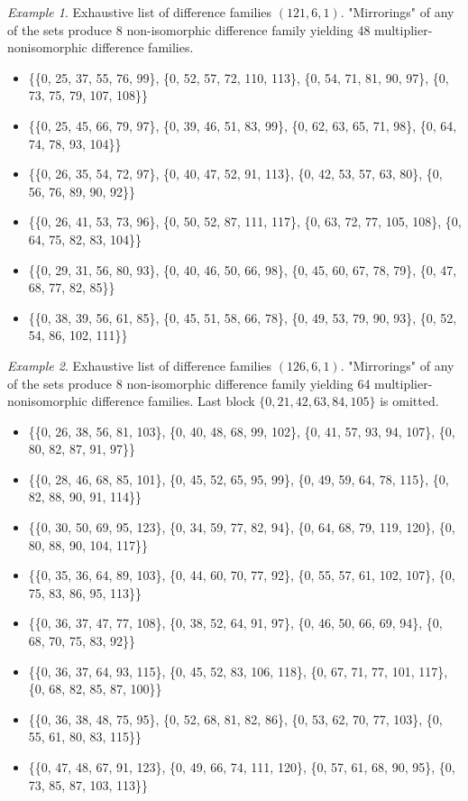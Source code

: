 \documentclass{amsart}
\theoremstyle{plain}
\theoremstyle{definition}
\theoremstyle{remark}
\newtheorem{example}{Example}[section]
\begin{document}
\begin{example} Exhaustive list of difference families $(121,6,1)$. "Mirrorings" of any of the sets produce 8 non-isomorphic difference family yielding 48 multiplier-nonisomorphic difference families.
\begin{itemize}
    \item \{\{0, 25, 37, 55, 76, 99\}, \{0, 52, 57, 72, 110, 113\}, \{0, 54, 71, 81, 90, 97\}, \{0, 73, 75, 79, 107, 108\}\}
    \item \{\{0, 25, 45, 66, 79, 97\}, \{0, 39, 46, 51, 83, 99\}, \{0, 62, 63, 65, 71, 98\}, \{0, 64, 74, 78, 93, 104\}\}
    \item \{\{0, 26, 35, 54, 72, 97\}, \{0, 40, 47, 52, 91, 113\}, \{0, 42, 53, 57, 63, 80\}, \{0, 56, 76, 89, 90, 92\}\}
    \item \{\{0, 26, 41, 53, 73, 96\}, \{0, 50, 52, 87, 111, 117\}, \{0, 63, 72, 77, 105, 108\}, \{0, 64, 75, 82, 83, 104\}\}
    \item \{\{0, 29, 31, 56, 80, 93\}, \{0, 40, 46, 50, 66, 98\}, \{0, 45, 60, 67, 78, 79\}, \{0, 47, 68, 77, 82, 85\}\}
    \item \{\{0, 38, 39, 56, 61, 85\}, \{0, 45, 51, 58, 66, 78\}, \{0, 49, 53, 79, 90, 93\}, \{0, 52, 54, 86, 102, 111\}\}
\end{itemize}
\end{example}
\begin{example} Exhaustive list of difference families $(126,6,1)$. "Mirrorings" of any of the sets produce 8 non-isomorphic difference family yielding 64 multiplier-nonisomorphic difference families. Last block $\{0,21,42,63,84,105\}$ is omitted.
\begin{itemize}
    \item \{\{0, 26, 38, 56, 81, 103\}, \{0, 40, 48, 68, 99, 102\}, \{0, 41, 57, 93, 94, 107\}, \{0, 80, 82, 87, 91, 97\}\}
    \item \{\{0, 28, 46, 68, 85, 101\}, \{0, 45, 52, 65, 95, 99\}, \{0, 49, 59, 64, 78, 115\}, \{0, 82, 88, 90, 91, 114\}\}
    \item \{\{0, 30, 50, 69, 95, 123\}, \{0, 34, 59, 77, 82, 94\}, \{0, 64, 68, 79, 119, 120\}, \{0, 80, 88, 90, 104, 117\}\}
    \item \{\{0, 35, 36, 64, 89, 103\}, \{0, 44, 60, 70, 77, 92\}, \{0, 55, 57, 61, 102, 107\}, \{0, 75, 83, 86, 95, 113\}\}
    \item \{\{0, 36, 37, 47, 77, 108\}, \{0, 38, 52, 64, 91, 97\}, \{0, 46, 50, 66, 69, 94\}, \{0, 68, 70, 75, 83, 92\}\}
    \item \{\{0, 36, 37, 64, 93, 115\}, \{0, 45, 52, 83, 106, 118\}, \{0, 67, 71, 77, 101, 117\}, \{0, 68, 82, 85, 87, 100\}\}
    \item \{\{0, 36, 38, 48, 75, 95\}, \{0, 52, 68, 81, 82, 86\}, \{0, 53, 62, 70, 77, 103\}, \{0, 55, 61, 80, 83, 115\}\}
    \item \{\{0, 47, 48, 67, 91, 123\}, \{0, 49, 66, 74, 111, 120\}, \{0, 57, 61, 68, 90, 95\}, \{0, 73, 85, 87, 103, 113\}\}
\end{itemize}
\end{example}
\end{document}
